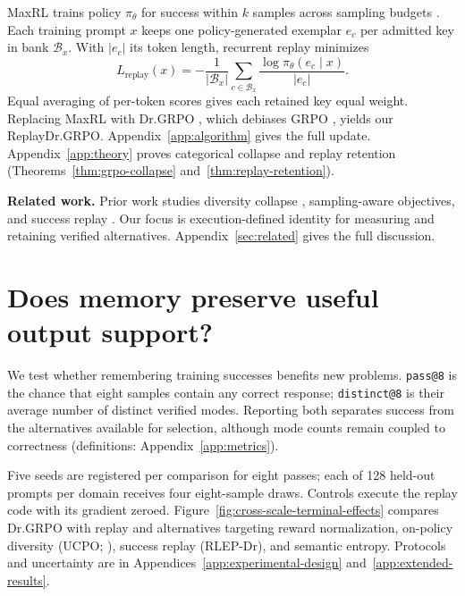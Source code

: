 MaxRL trains policy $\pi_\theta$ for success within $k$ samples across sampling
budgets \citep{tajwar2026maxrl}. Each training prompt $x$ keeps one
policy-generated exemplar $e_c$ per admitted key in bank $\mathcal B_x$.
With $|e_c|$ its token length, recurrent replay minimizes
\begin{equation}
L_{\mathrm{replay}}(x)=-\frac{1}{|\mathcal B_x|}
\sum_{c\in\mathcal B_x}\frac{\log\pi_\theta(e_c\mid x)}{|e_c|}.
\label{eq:lm-verified-replay}
\end{equation}
Equal averaging of per-token scores gives each retained key equal weight. Replacing MaxRL with Dr.GRPO \citep{liu2025understanding},
which debiases GRPO \citep{shao2024deepseekmath}, yields our ReplayDr.GRPO.
Appendix~\ref{app:algorithm} gives
the full update. Appendix~\ref{app:theory} proves categorical collapse and
replay retention (Theorems~\ref{thm:grpo-collapse} and~\ref{thm:replay-retention}).

\noindent\textbf{Related work.} Prior work studies diversity collapse
\citep{cui2025entropy,dang2025diversity}, sampling-aware objectives, and success
replay \citep{zhang2025rlep}. Our focus is execution-defined identity for
measuring and retaining verified alternatives. Appendix~\ref{sec:related}
gives the full discussion.

\section{Does memory preserve useful output support?}
\label{sec:experiments}\label{sec:results}
We test whether remembering training successes benefits new problems.
\texttt{pass@8} is the chance that eight samples contain any correct response;
\texttt{distinct@8} is their average number of distinct verified modes. Reporting
both separates success from the alternatives available for selection, although
mode counts remain coupled to correctness (definitions: Appendix~\ref{app:metrics}).

Five seeds are registered per comparison for eight passes; each of 128 held-out prompts per
domain receives four eight-sample draws. Controls execute the replay code with its gradient zeroed. Figure~\ref{fig:cross-scale-terminal-effects} compares
Dr.GRPO with replay and alternatives targeting reward normalization, on-policy
diversity (UCPO; \citealp{lochab2026ucpo}), success replay (RLEP-Dr),
and semantic entropy. Protocols and uncertainty are in
Appendices~\ref{app:experimental-design} and~\ref{app:extended-results}.


